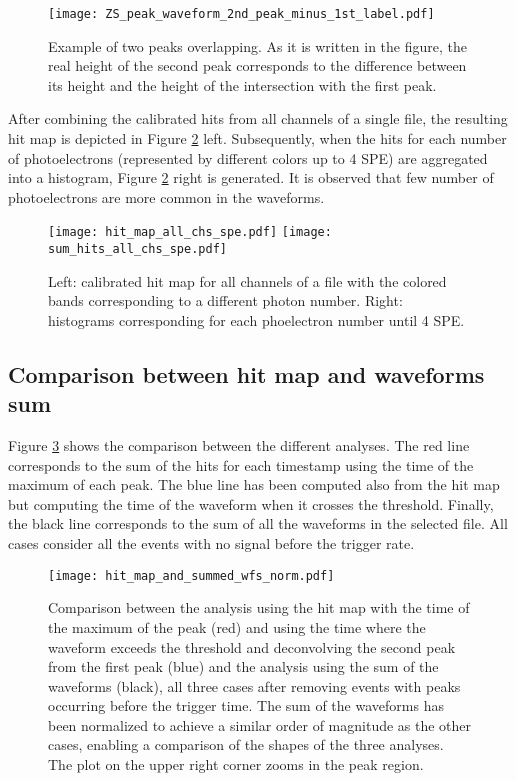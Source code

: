 \documentclass[11pt,a4paper,english,oneside, pdf]{article}
\begin{document}
	\begin{figure}[!h]
		\begin{center}
			\texttt{[image: ZS\_peak\_waveform\_2nd\_peak\_minus\_1st\_label.pdf]}
			\caption{Example of two peaks overlapping. As it is written in the figure, the real height of the second peak corresponds to the difference between its height and the height of the intersection with the first peak.}
			\label{fig:ZS_peak_waveform_2nd_peak_minus_1st}
		\end{center}
	\end{figure}

	
	After combining the calibrated hits from all channels of a single file, the resulting hit map is depicted in Figure \ref{fig:hit_map_all_chs_spe} left. Subsequently, when the hits for each number of photoelectrons (represented by different colors up to 4 SPE) are aggregated into a histogram, Figure \ref{fig:hit_map_all_chs_spe} right is generated. It is observed that few number of photoelectrons are more common in the waveforms.
	
	\begin{figure}[!h]
		\centering
		\texttt{[image: hit\_map\_all\_chs\_spe.pdf]}
		\texttt{[image: sum\_hits\_all\_chs\_spe.pdf]}
		\caption{Left: calibrated hit map for all channels of a file with the colored bands corresponding to a different photon number. Right: histograms corresponding for each phoelectron number until 4 SPE.}
		\label{fig:hit_map_all_chs_spe}
	\end{figure}
	
	
	\subsection{Comparison between hit map and waveforms sum}
	
	Figure \ref{fig:hit_map_and_summed_wfs_norm} shows the comparison between the different analyses. The red line corresponds to the sum of the hits for each timestamp using the time of the maximum of each peak. The blue line has been computed also from the hit map but computing the time of the waveform when it crosses the threshold. Finally, the black line corresponds to the sum of all the waveforms in the selected file. All cases consider all the events with no signal before the trigger rate.
	
	\begin{figure}[!h]
		\begin{center}
			\texttt{[image: hit\_map\_and\_summed\_wfs\_norm.pdf]}
			\caption{Comparison between the analysis using the hit map with the time of the maximum of the peak (red) and using the time where the waveform exceeds the threshold and deconvolving the second peak from the first peak (blue) and the analysis using the sum of the waveforms (black), all three cases after removing events with peaks occurring before the trigger time. The sum of the waveforms has been normalized to achieve a similar order of magnitude as the other cases, enabling a comparison of the shapes of the three analyses. The plot on the upper right corner zooms in the peak region.}
			\label{fig:hit_map_and_summed_wfs_norm}
		\end{center}
	\end{figure}
	
\end{document}
